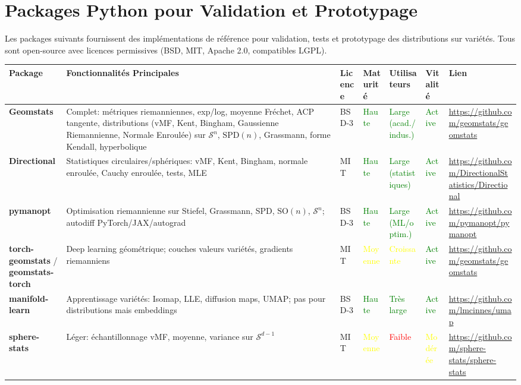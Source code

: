 \documentclass[11pt,a4paper]{article}
\begin{document}
\section{Packages Python pour Validation et Prototypage}

Les packages suivants fournissent des implémentations de référence pour validation, tests et prototypage des distributions sur variétés. Tous sont open-source avec licences permissives (BSD, MIT, Apache 2.0, compatibles LGPL).

\begin{longtable}{@{}p{2.3cm}p{3.8cm}p{1.5cm}p{1.5cm}p{1.5cm}p{1.5cm}p{2.5cm}@{}}
\toprule
\textbf{Package} & \textbf{Fonctionnalités Principales} & \textbf{Licence} & \textbf{Maturité} & \textbf{Utilisateurs} & \textbf{Vitalité} & \textbf{Lien} \\
\midrule
\textbf{Geomstats} & Complet: métriques riemanniennes, exp/log, moyenne Fréchet, ACP tangente, distributions (vMF, Kent, Bingham, Gaussienne Riemannienne, Normale Enroulée) sur $\mathcal{S}^n$, $\text{SPD}(n)$, Grassmann, forme Kendall, hyperbolique & BSD-3 & \textcolor{green}{Haute} & \textcolor{green}{Large (acad./indus.)} & \textcolor{green}{Active} & \url{https://github.com/geomstats/geomstats} \\
\textbf{Directional} & Statistiques circulaires/sphériques: vMF, Kent, Bingham, normale enroulée, Cauchy enroulée, tests, MLE & MIT & \textcolor{green}{Haute} & \textcolor{green}{Large (statistiques)} & \textcolor{green}{Active} & \url{https://github.com/DirectionalStatistics/Directional} \\
\textbf{pymanopt} & Optimisation riemannienne sur Stiefel, Grassmann, SPD, $\text{SO}(n)$, $\mathcal{S}^n$; autodiff PyTorch/JAX/autograd & BSD-3 & \textcolor{green}{Haute} & \textcolor{green}{Large (ML/optim.)} & \textcolor{green}{Active} & \url{https://github.com/pymanopt/pymanopt} \\
\textbf{torch-geomstats} / \textbf{geomstats-torch} & Deep learning géométrique; couches valeurs variétés, gradients riemanniens & MIT & \textcolor{yellow}{Moyenne} & \textcolor{yellow}{Croissante} & \textcolor{green}{Active} & \url{https://github.com/geomstats/geomstats} \\
\textbf{manifold-learn} & Apprentissage variétés: Isomap, LLE, diffusion maps, UMAP; pas pour distributions mais embeddings & BSD-3 & \textcolor{green}{Haute} & \textcolor{green}{Très large} & \textcolor{green}{Active} & \url{https://github.com/lmcinnes/umap} \\
\textbf{sphere-stats} & Léger: échantillonnage vMF, moyenne, variance sur $\mathcal{S}^{d-1}$ & MIT & \textcolor{yellow}{Moyenne} & \textcolor{red}{Faible} & \textcolor{yellow}{Modérée} & \url{https://github.com/sphere-stats/sphere-stats} \\

\end{longtable}
\end{document}
